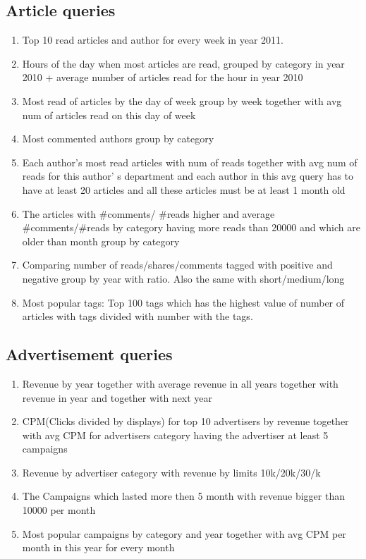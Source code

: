 \subsection*{Article queries} %
\label{sub:Article  queries}
\begin{enumerate}
\item    Top 10 read articles and author for every week in year 2011.
\item    Hours of the day when most articles are read, grouped by category in year 2010 + average number of articles read for the hour in year 2010
\item    Most read of articles by the day of week group by week together with avg num of articles read on this day of week
\item    Most commented authors group by category
\item    Each author’s most read articles with num of reads together with avg num of reads for this author’ s department and each author in this avg query has to have at least 20 articles and all these articles must be at least 1 month old
\item    The articles with  \#comments/ \#reads higher and average \#comments/\#reads by category having more reads  than 20000 and which are older than month group by category
\item    Comparing number of reads/shares/comments tagged with positive and negative group by year with ratio. Also the same with short/medium/long
\item    Most popular tags:  Top 100 tags which has the highest value of number of articles with tags divided with number with the tags.
\end{enumerate}

\subsection*{Advertisement  queries} %
\label{sub:Advertisement queries}

\begin{enumerate}
\item    Revenue by year together with average revenue in all years together with revenue in year and together with next year
\item    CPM(Clicks divided by displays) for top 10 advertisers by revenue together with avg CPM for advertisers category having the advertiser at least 5 campaigns
\item    Revenue by advertiser category with revenue by limits 10k/20k/30/k
\item    The Campaigns which lasted more then 5 month with revenue bigger than 10000 per month
\item    Most popular campaigns by category and year together with avg CPM per month in this year for every month
\end{enumerate}


